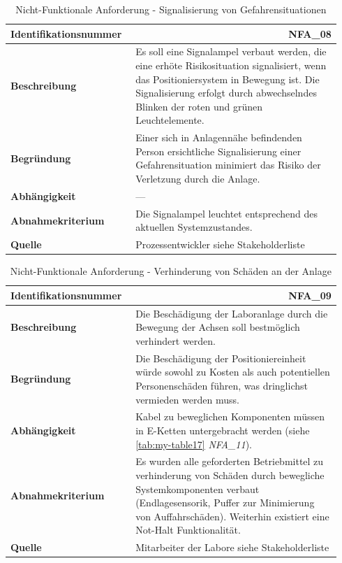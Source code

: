 \documentclass[../../../Bachelorarbeit.tex]{subfiles}
\begin{document}
\begin{table}[H]
    \centering
    \begin{tabular}{ p{0.34\linewidth}  p{0.6\linewidth} }
        \hline
        \textbf{Identifikationsnummer}  & \multicolumn{1}{r}{NFA\_08} \\ \hline
        \textbf{Beschreibung}           & Es soll eine Signalampel verbaut werden, die eine erhöte Risikosituation signalisiert, wenn das Positioniersystem in Bewegung ist. Die Signalisierung erfolgt durch abwechselndes Blinken der roten und grünen Leuchtelemente. \\
        \textbf{Begründung}             & Einer sich in Anlagennähe befindenden Person ersichtliche Signalisierung einer Gefahrensituation minimiert das Risiko der Verletzung durch die Anlage. \\
        \textbf{Abhängigkeit}           & --- \\
        \textbf{Abnahmekriterium}       & Die Signalampel leuchtet entsprechend des aktuellen Systemzustandes. \\
        \textbf{Quelle}                 & Prozessentwickler siehe Stakeholderliste \\ \hline
    \end{tabular}
    \caption[\acs{nfa} - Signalisierung Gefahrensituation]{Nicht-Funktionale Anforderung - Signalisierung von Gefahrensituationen}
    \label{tab:my-table14}
\end{table}
\begin{table}[H]
    \centering
    \begin{tabular}{ p{0.34\linewidth}  p{0.6\linewidth} }
        \hline
        \textbf{Identifikationsnummer}  & \multicolumn{1}{r}{NFA\_09} \\ \hline
        \textbf{Beschreibung}           & Die Beschädigung der Laboranlage durch die Bewegung der Achsen soll bestmöglich verhindert werden. \\
        \textbf{Begründung}             & Die Beschädigung der Positioniereinheit würde sowohl zu Kosten als auch potentiellen Personenschäden führen, was dringlichst vermieden werden muss. \\
        \textbf{Abhängigkeit}           & Kabel zu beweglichen Komponenten müssen in E-Ketten untergebracht werden (siehe \autoref{tab:my-table17} \textit{NFA\_11}). \\
        \textbf{Abnahmekriterium}       & Es wurden alle geforderten Betriebmittel zu verhinderung von Schäden durch bewegliche Systemkomponenten verbaut (Endlagesensorik, Puffer zur Minimierung von Auffahrschäden). Weiterhin existiert eine Not-Halt Funktionalität. \\
        \textbf{Quelle}                 & Mitarbeiter der Labore siehe Stakeholderliste \\ \hline
    \end{tabular}
    \caption[\acs{nfa} - Verhinderung von Schäden an der Anlage]{Nicht-Funktionale Anforderung - Verhinderung von Schäden an der Anlage}
    \label{tab:my-table15}
\end{table}
\end{document}
